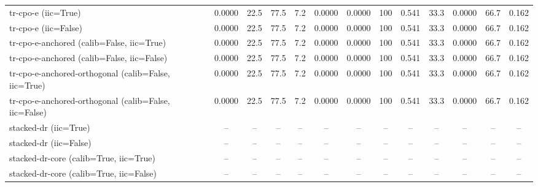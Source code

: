 \begin{table}[htbp]
\begin{tabular}{l|cccccccccccc}
tr-cpo-e (iic=True) & 0.0000 & 22.5 & 77.5 & 7.2 & 0.0000 & 0.0000 & 100 & 0.541 & 33.3 & 0.0000 & 66.7 & 0.162 \\
tr-cpo-e (iic=False) & 0.0000 & 22.5 & 77.5 & 7.2 & 0.0000 & 0.0000 & 100 & 0.541 & 33.3 & 0.0000 & 66.7 & 0.162 \\
tr-cpo-e-anchored (calib=False, iic=True) & 0.0000 & 22.5 & 77.5 & 7.2 & 0.0000 & 0.0000 & 100 & 0.541 & 33.3 & 0.0000 & 66.7 & 0.162 \\
tr-cpo-e-anchored (calib=False, iic=False) & 0.0000 & 22.5 & 77.5 & 7.2 & 0.0000 & 0.0000 & 100 & 0.541 & 33.3 & 0.0000 & 66.7 & 0.162 \\
tr-cpo-e-anchored-orthogonal (calib=False, iic=True) & 0.0000 & 22.5 & 77.5 & 7.2 & 0.0000 & 0.0000 & 100 & 0.541 & 33.3 & 0.0000 & 66.7 & 0.162 \\
tr-cpo-e-anchored-orthogonal (calib=False, iic=False) & 0.0000 & 22.5 & 77.5 & 7.2 & 0.0000 & 0.0000 & 100 & 0.541 & 33.3 & 0.0000 & 66.7 & 0.162 \\
stacked-dr (iic=True) & -- & -- & -- & -- & -- & -- & -- & -- & -- & -- & -- & -- \\
stacked-dr (iic=False) & -- & -- & -- & -- & -- & -- & -- & -- & -- & -- & -- & -- \\
stacked-dr-core (calib=True, iic=True) & -- & -- & -- & -- & -- & -- & -- & -- & -- & -- & -- & -- \\
stacked-dr-core (calib=True, iic=False) & -- & -- & -- & -- & -- & -- & -- & -- & -- & -- & -- & -- \\
\bottomrule
\end{tabular}
\end{table}
